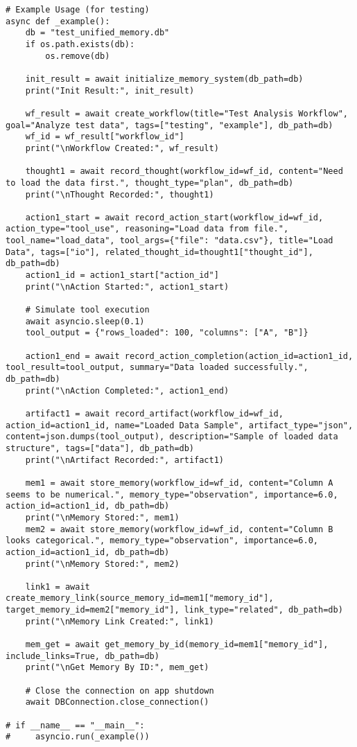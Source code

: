 \documentclass[12pt,a4paper]{article}
\begin{document}
\begin{pageablecode}
\begin{verbatim}
# Example Usage (for testing)
async def _example():
    db = "test_unified_memory.db"
    if os.path.exists(db):
        os.remove(db)

    init_result = await initialize_memory_system(db_path=db)
    print("Init Result:", init_result)

    wf_result = await create_workflow(title="Test Analysis Workflow", goal="Analyze test data", tags=["testing", "example"], db_path=db)
    wf_id = wf_result["workflow_id"]
    print("\nWorkflow Created:", wf_result)

    thought1 = await record_thought(workflow_id=wf_id, content="Need to load the data first.", thought_type="plan", db_path=db)
    print("\nThought Recorded:", thought1)

    action1_start = await record_action_start(workflow_id=wf_id, action_type="tool_use", reasoning="Load data from file.", tool_name="load_data", tool_args={"file": "data.csv"}, title="Load Data", tags=["io"], related_thought_id=thought1["thought_id"], db_path=db)
    action1_id = action1_start["action_id"]
    print("\nAction Started:", action1_start)

    # Simulate tool execution
    await asyncio.sleep(0.1)
    tool_output = {"rows_loaded": 100, "columns": ["A", "B"]}

    action1_end = await record_action_completion(action_id=action1_id, tool_result=tool_output, summary="Data loaded successfully.", db_path=db)
    print("\nAction Completed:", action1_end)

    artifact1 = await record_artifact(workflow_id=wf_id, action_id=action1_id, name="Loaded Data Sample", artifact_type="json", content=json.dumps(tool_output), description="Sample of loaded data structure", tags=["data"], db_path=db)
    print("\nArtifact Recorded:", artifact1)

    mem1 = await store_memory(workflow_id=wf_id, content="Column A seems to be numerical.", memory_type="observation", importance=6.0, action_id=action1_id, db_path=db)
    print("\nMemory Stored:", mem1)
    mem2 = await store_memory(workflow_id=wf_id, content="Column B looks categorical.", memory_type="observation", importance=6.0, action_id=action1_id, db_path=db)
    print("\nMemory Stored:", mem2)

    link1 = await create_memory_link(source_memory_id=mem1["memory_id"], target_memory_id=mem2["memory_id"], link_type="related", db_path=db)
    print("\nMemory Link Created:", link1)

    mem_get = await get_memory_by_id(memory_id=mem1["memory_id"], include_links=True, db_path=db)
    print("\nGet Memory By ID:", mem_get)

    # Close the connection on app shutdown
    await DBConnection.close_connection()

# if __name__ == "__main__":
#     asyncio.run(_example())
\end{verbatim}
\end{pageablecode}
\end{document}
